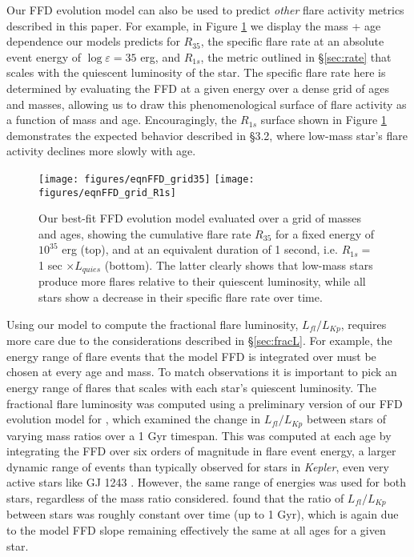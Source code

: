 \documentclass[preprint2]{aastex62}
\newcommand{\Kepler}{\textsl{Kepler}\xspace}
\begin{document}
Our FFD evolution model can also be used to predict {\it other} flare activity metrics described in this paper. For example, in Figure \ref{fig:grid} we display the mass + age dependence our models predicts for $R_{35}$, the specific flare rate at an absolute event energy of $\log \varepsilon = 35$ erg, and $R_{1s}$, the metric outlined in \S\ref{sec:rate} that scales with the quiescent luminosity of the star. The specific flare rate here is determined by evaluating the FFD at a given energy over a dense grid of ages and masses, allowing us to draw this phenomenological surface of flare activity as a function of mass and age. 
Encouragingly, the $R_{1s}$ surface shown in Figure \ref{fig:grid} demonstrates the expected behavior described in \S3.2, where low-mass star's flare activity declines more slowly with age.


\begin{figure}[!t]
\centering
\texttt{[image: figures/eqnFFD\_grid35]}
\texttt{[image: figures/eqnFFD\_grid\_R1s]}
\caption{
Our best-fit FFD evolution model evaluated over a grid of masses and ages, showing the cumulative flare rate $R_{35}$ for a fixed energy of $10^35$ erg (top), and at an equivalent duration of 1 second, i.e. $R_{1s} = $ 1 sec $\times L_{quies}$ (bottom). The latter clearly shows that low-mass stars produce more flares relative to their quiescent luminosity, while all stars show a decrease in their specific flare rate over time.
}
\label{fig:grid}
\end{figure}



Using our model to compute the fractional flare luminosity, $L_{fl}/L_{Kp}$, requires more care due to the considerations described in \S\ref{sec:fracL}. For example, the energy range of flare events that the model FFD is integrated over must be chosen at every age and mass. To match observations it is important to pick an energy range of flares that scales with each star's quiescent luminosity. The fractional flare luminosity was computed using a preliminary version of our FFD evolution model for \citet{clarke2018}, which examined the change in $L_{fl}/L_{Kp}$ between stars of varying mass ratios over a 1 Gyr timespan. This was computed at each age by integrating the FFD over six orders of magnitude in flare event energy, a larger dynamic range of events than typically observed for stars in \Kepler, even very active stars like GJ 1243 \citep{hawley2014}. However, the same range of energies was used for both stars, regardless of the mass ratio considered. \citet{clarke2018} found that the ratio of $L_{fl}/L_{Kp}$ between stars was roughly constant over time (up to 1 Gyr), which is again due to the model FFD slope remaining effectively the same at all ages for a given star.
\end{document}
